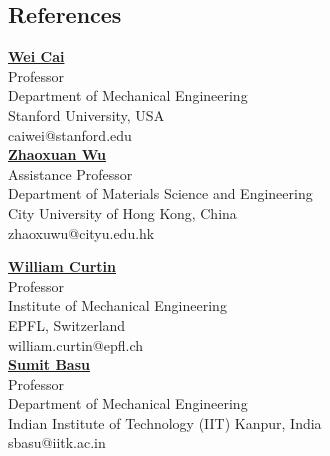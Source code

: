\documentclass[margin,line]{resume}
\begin{document}
\begin{resume}
    \section{\mysidestyle References}
    \begin{minipage}[t]{0.5\textwidth}
        \href{https://web.stanford.edu/~caiwei/}{\textbf{\textsf{Wei Cai}}}\\
        Professor\\
        Department of Mechanical Engineering\\
        Stanford University, USA \\
        caiwei@stanford.edu\\[1em]
        \href{https://scholars.cityu.edu.hk/en/persons/zhaoxuan-wu(32022051-be5f-44e8-84eb-794d8f78d35c).html}{\textbf{\textsf{Zhaoxuan Wu}}}\\
        Assistance Professor\\
        Department of Materials Science and Engineering\\
        City University of Hong Kong, China\\
        zhaoxuwu@cityu.edu.hk\\[1em]
    \end{minipage}
    \begin{minipage}[t]{0.5\textwidth}
        \href{https://people.epfl.ch//william.curtin?lang=en}{\textbf{\textsf{William Curtin}}}\\
        Professor\\
        Institute of Mechanical Engineering\\
        EPFL, Switzerland\\
        william.curtin@epfl.ch\\[1em]
        \href{http://home.iitk.ac.in/~sbasu/}{\textbf{\textsf{Sumit Basu}}}\\
        Professor\\
        Department of Mechanical Engineering\\
        Indian Institute of Technology (IIT) Kanpur, India\\
        sbasu@iitk.ac.in\\[1em]
    \end{minipage}

\end{resume}
\end{document}
